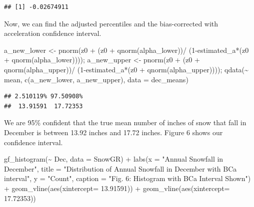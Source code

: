 \documentclass[12pt]{article}
\newenvironment{Shaded}{\begin{snugshade}}{\end{snugshade}}
\newcommand{\AttributeTok}[1]{\textcolor[rgb]{0.77,0.63,0.00}{#1}}
\newcommand{\DecValTok}[1]{\textcolor[rgb]{0.00,0.00,0.81}{#1}}
\newcommand{\FloatTok}[1]{\textcolor[rgb]{0.00,0.00,0.81}{#1}}
\newcommand{\FunctionTok}[1]{\textcolor[rgb]{0.00,0.00,0.00}{#1}}
\newcommand{\NormalTok}[1]{#1}
\newcommand{\OtherTok}[1]{\textcolor[rgb]{0.56,0.35,0.01}{#1}}
\newcommand{\SpecialCharTok}[1]{\textcolor[rgb]{0.00,0.00,0.00}{#1}}
\newcommand{\StringTok}[1]{\textcolor[rgb]{0.31,0.60,0.02}{#1}}
\begin{document}
\begin{verbatim}
## [1] -0.02674911
\end{verbatim}

Now, we can find the adjusted percentiles and the bias-corrected with
acceleration confidence interval.

\begin{Shaded}
\begin{Highlighting}[]
\NormalTok{a\_new\_lower }\OtherTok{\textless{}{-}} \FunctionTok{pnorm}\NormalTok{(z0 }\SpecialCharTok{+}\NormalTok{ (z0 }\SpecialCharTok{+} \FunctionTok{qnorm}\NormalTok{(alpha\_lower))}\SpecialCharTok{/}
\NormalTok{                    (}\DecValTok{1}\SpecialCharTok{{-}}\NormalTok{estimated\_a}\SpecialCharTok{*}\NormalTok{(z0 }\SpecialCharTok{+} \FunctionTok{qnorm}\NormalTok{(alpha\_lower)))); }
\NormalTok{a\_new\_upper }\OtherTok{\textless{}{-}} \FunctionTok{pnorm}\NormalTok{(z0 }\SpecialCharTok{+}\NormalTok{ (z0 }\SpecialCharTok{+} \FunctionTok{qnorm}\NormalTok{(alpha\_upper))}\SpecialCharTok{/}
\NormalTok{                     (}\DecValTok{1}\SpecialCharTok{{-}}\NormalTok{estimated\_a}\SpecialCharTok{*}\NormalTok{(z0 }\SpecialCharTok{+} \FunctionTok{qnorm}\NormalTok{(alpha\_upper)))); }
\FunctionTok{qdata}\NormalTok{(}\SpecialCharTok{\textasciitilde{}}\NormalTok{ mean, }\FunctionTok{c}\NormalTok{(a\_new\_lower, a\_new\_upper), }\AttributeTok{data =}\NormalTok{ dec\_means)}
\end{Highlighting}
\end{Shaded}

\begin{verbatim}
## 2.510119% 97.50908% 
##  13.91591  17.72353
\end{verbatim}

We are 95\% confident that the true mean number of inches of snow that
fall in December is between 13.92 inches and 17.72 inches. Figure 6
shows our confidence interval.

\begin{Shaded}
\begin{Highlighting}[]
\FunctionTok{gf\_histogram}\NormalTok{(}\SpecialCharTok{\textasciitilde{}}\NormalTok{ Dec, }\AttributeTok{data =}\NormalTok{ SnowGR) }\SpecialCharTok{+}
  \FunctionTok{labs}\NormalTok{(}\AttributeTok{x =} \StringTok{"Annual Snowfall in December"}\NormalTok{, }
       \AttributeTok{title =} \StringTok{"Distribution of Annual Snowfall in December}
\StringTok{       with BCa interval"}\NormalTok{, }\AttributeTok{y =} \StringTok{"Count"}\NormalTok{,}
       \AttributeTok{caption =} \StringTok{"Fig. 6: Histogram with BCa Interval Shown"}\NormalTok{) }\SpecialCharTok{+}
  \FunctionTok{geom\_vline}\NormalTok{(}\FunctionTok{aes}\NormalTok{(}\AttributeTok{xintercept=} \FloatTok{13.91591}\NormalTok{)) }\SpecialCharTok{+}
  \FunctionTok{geom\_vline}\NormalTok{(}\FunctionTok{aes}\NormalTok{(}\AttributeTok{xintercept=} \FloatTok{17.72353}\NormalTok{))}
\end{Highlighting}
\end{Shaded}
\end{document}
